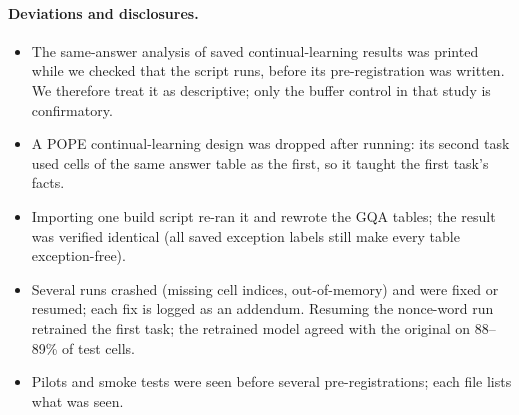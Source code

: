 \paragraph{Deviations and disclosures.}
\begin{itemize}
  \item The same-answer analysis of saved continual-learning results was printed while we
  checked that the script runs, before its pre-registration was written. We therefore treat it
  as descriptive; only the buffer control in that study is confirmatory.
  \item A POPE continual-learning design was dropped after running: its second task used cells
  of the same answer table as the first, so it taught the first task's facts.
  \item Importing one build script re-ran it and rewrote the GQA tables; the result was
  verified identical (all saved exception labels still make every table exception-free).
  \item Several runs crashed (missing cell indices, out-of-memory) and were fixed or resumed;
  each fix is logged as an addendum. Resuming the nonce-word run retrained the first task; the
  retrained model agreed with the original on 88--89\% of test cells.
  \item Pilots and smoke tests were seen before several pre-registrations; each file lists
  what was seen.
\end{itemize}
